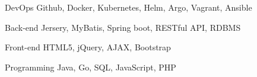 

\begin{cvskills}

  \cvskill
    {DevOps} %
    {Github, Docker, Kubernetes, Helm, Argo, Vagrant, Ansible} %

  \cvskill
    {Back-end} %
    {Jersery, MyBatis, Spring boot, RESTful API, RDBMS} %

  \cvskill
    {Front-end} %
    {HTML5, jQuery, AJAX, Bootstrap} %

  \cvskill
    {Programming} %
    {Java, Go, SQL, JavaScript, PHP} %


\end{cvskills}
